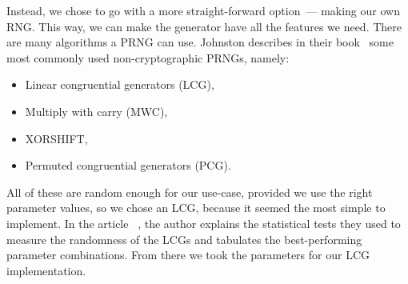 Instead, we chose to go with a more straight-forward option~--- making our own RNG.
This way, we can make the generator have all the features we need.
There are many algorithms a PRNG can use.
Johnston describes in their book~\cite{johnston2018random} some most commonly used non-cryptographic PRNGs, namely:
\begin{itemize}
    \item Linear congruential generators (LCG),
    \item Multiply with carry (MWC),
    \item XORSHIFT,
    \item Permuted congruential generators (PCG).
\end{itemize}
All of these are random enough for our use-case, provided we use the right parameter values, so we chose an LCG, because it seemed the most simple to implement.
In the article ~\cite{LCGTables}, the author explains the statistical tests they used to measure the randomness of the LCGs and tabulates the best-performing parameter combinations.
From there we took the parameters for our LCG implementation.